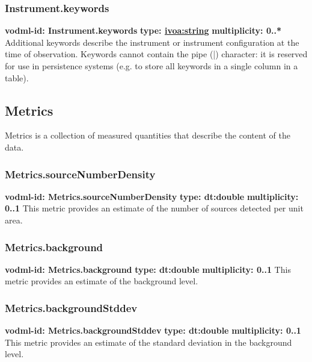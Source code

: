     \subsubsection{Instrument.keywords}
      \textbf{vodml-id: Instrument.keywords} \newline
      \textbf{type: \hyperref[sect:ivoa]{ivoa:string}} \newline
      \textbf{multiplicity: 0..*} \newline
      Additional keywords describe the instrument or instrument configuration at the time of observation. Keywords cannot contain the pipe (|) character: it is reserved for use in persistence systems (e.g. to store all keywords in a single column in a table).

  \subsection{Metrics}
  \label{sect:Metrics}
    Metrics is a collection of measured quantities that describe the content of the data.

    \subsubsection{Metrics.sourceNumberDensity}
      \textbf{vodml-id: Metrics.sourceNumberDensity} \newline
      \textbf{type: dt:double} \newline
      \textbf{multiplicity: 0..1} \newline
      This metric provides an estimate of the number of sources detected per unit area.

    \subsubsection{Metrics.background}
      \textbf{vodml-id: Metrics.background} \newline
      \textbf{type: dt:double} \newline
      \textbf{multiplicity: 0..1} \newline
      This metric provides an estimate of the background level.

    \subsubsection{Metrics.backgroundStddev}
      \textbf{vodml-id: Metrics.backgroundStddev} \newline
      \textbf{type: dt:double} \newline
      \textbf{multiplicity: 0..1} \newline
      This metric provides an estimate of the standard deviation in the background level.


